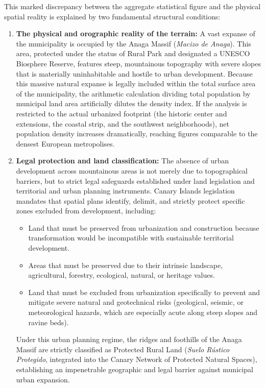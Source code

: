 This marked discrepancy between the aggregate statistical figure and the physical spatial reality is explained by two fundamental structural conditions:

\begin{enumerate}
  \item \textbf{The physical and orographic reality of the terrain:} A vast expanse of the municipality is occupied by the Anaga Massif (\emph{Macizo de Anaga}). This area, protected under the status of Rural Park and designated a UNESCO Biosphere Reserve, features steep, mountainous topography with severe slopes that is materially uninhabitable and hostile to urban development. Because this massive natural expanse is legally included within the total surface area of the municipality, the arithmetic calculation dividing total population by municipal land area artificially dilutes the density index. If the analysis is restricted to the actual urbanized footprint (the historic center and extensions, the coastal strip, and the southwest neighborhoods), net population density increases dramatically, reaching figures comparable to the densest European metropolises.
  \item \textbf{Legal protection and land classification:} The absence of urban development across mountainous areas is not merely due to topographical barriers, but to strict legal safeguards established under land legislation and territorial and urban planning instruments. Canary Islands legislation mandates that spatial plans identify, delimit, and strictly protect specific zones excluded from development, including:
  \begin{itemize}
    \item Land that must be preserved from urbanization and construction because transformation would be incompatible with sustainable territorial development.
    \item Areas that must be preserved due to their intrinsic landscape, agricultural, forestry, ecological, natural, or heritage values.
    \item Land that must be excluded from urbanization specifically to prevent and mitigate severe natural and geotechnical risks (geological, seismic, or meteorological hazards, which are especially acute along steep slopes and ravine beds).
  \end{itemize}
  Under this urban planning regime, the ridges and foothills of the Anaga Massif are strictly classified as Protected Rural Land (\emph{Suelo Rústico Protegido}, integrated into the Canary Network of Protected Natural Spaces), establishing an impenetrable geographic and legal barrier against municipal urban expansion.
\end{enumerate}

